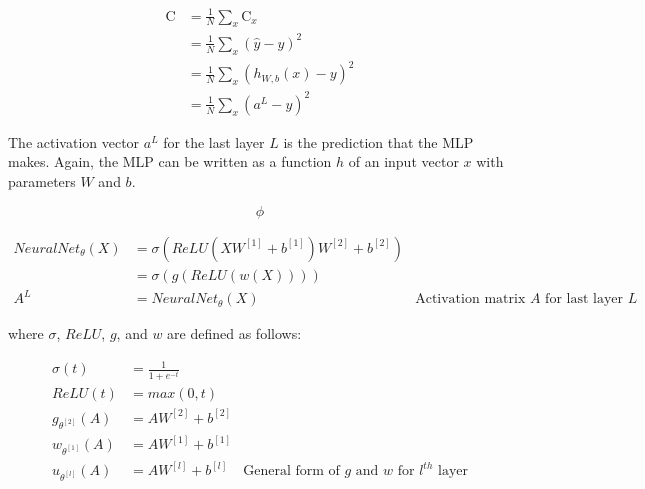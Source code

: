 \documentclass{article}
\begin{document}
\begin{equation}
	\begin{aligned}
		\text{C} & = \frac{1}{N} \sum_{x} {\text{C}_x}            \\
		         & = \frac{1}{N} \sum_{x} {(\hat{y} - y)^{2} }    \\
		         & = \frac{1}{N} \sum_{x} {(h_{W,b}(x) - y)^{2} } \\
		         & = \frac{1}{N} \sum_{x} {(a^{L} - y)^{2} }
	\end{aligned}
\end{equation}

The activation vector $a^{L}$ for the last layer $L$ is the prediction
that the MLP makes. Again, the MLP can be written as a function $h$ of an
input vector $x$ with parameters $W$ and $b$.

\begin{equation}
	\phi
\end{equation}

\begin{equation}
	\begin{aligned}
		NeuralNet_{\theta}(X) & =
		\sigma(ReLU(XW^{[1]}
		+ {b}^{[1]})W^{[2]} + {b}^{[2]})                                                                  \\
		                      & = \sigma(g(ReLU(w(X))))                                                   \\
		A^{L}                 & = NeuralNet_{\theta}(X) & \text{Activation matrix $A$ for last layer $L$}
	\end{aligned}
\end{equation}

where $\sigma$, $ReLU$, $g$, and $w$ are defined as follows:

\begin{equation}
	\begin{aligned}
		\sigma(t)           & = \frac{1}{1 + e^{-t}}                                                         \\
		ReLU(t)             & = max(0, t)                                                                    \\
		g_{\theta^{[2]}}(A) & = AW^{[2]} + {b}^{[2]}                                                         \\
		w_{\theta^{[1]}}(A) & = AW^{[1]} + {b}^{[1]}                                                         \\
		u_{\theta^{[l]}}(A) & = AW^{[l]} + b^{[l]}   & \text{General form of $g$ and $w$ for $l^{th}$ layer}
	\end{aligned}
\end{equation}
\end{document}
